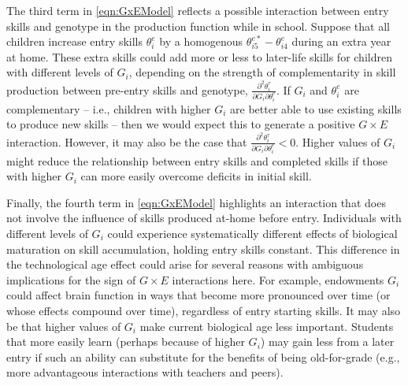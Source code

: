 \documentclass[12pt,a4paper]{article}
\begin{document}
\begin{bibunit}
The third term in \autoref{eqn:GxEModel} reflects a possible interaction between entry skills and genotype in the production function while in school. Suppose that all children increase entry skills $\theta_{i}^{e}$ by a homogenous $\theta_{i5}^{e*}-\theta_{i4}^{e}$ during an extra year at home. These extra skills could add more or less to later-life skills for children with different levels of $G_{i}$, depending on the strength of complementarity in skill production between pre-entry skills and genotype, $\frac{\partial^2 \theta_{i}^\tau}{\partial G_{i} \partial \theta_{i}^e}$.  If $G_{i}$ and $\theta^{e}_{i}$ are complementary -- i.e., children with higher $G_{i}$ are better able to use existing skills to produce new skills -- then we would expect this to generate a positive $G\times{}E$ interaction.  However, it may also be the case that $\frac{\partial^2 \theta_{i}^\tau}{\partial G_{i} \partial \theta_{i}^e}<0$.  Higher values of $G_{i}$ might reduce the relationship between entry skills and completed skills if those with higher $G_{i}$ can more easily overcome deficits in initial skill.

Finally, the fourth term in \autoref{eqn:GxEModel} highlights an interaction that does not involve the influence of skills produced at-home before entry.  
Individuals with different levels of $G_{i}$ could experience systematically different effects of biological maturation on skill accumulation, holding entry skills constant. This difference in the technological age effect could arise for several reasons with ambiguous implications for the sign of $G\times{}E$ interactions here.   For example, endowments $G_{i}$ could affect brain function in ways that become more pronounced over time (or whose effects compound over time), regardless of entry starting skills.  It may also be that higher values of $G_{i}$ make current biological age less important.  Students that more easily learn (perhaps because of higher $G_{i}$) may gain less from a later entry if such an ability can substitute for the benefits of being old-for-grade (e.g., more advantageous interactions with teachers and peers).


\end{bibunit}
\end{document}
